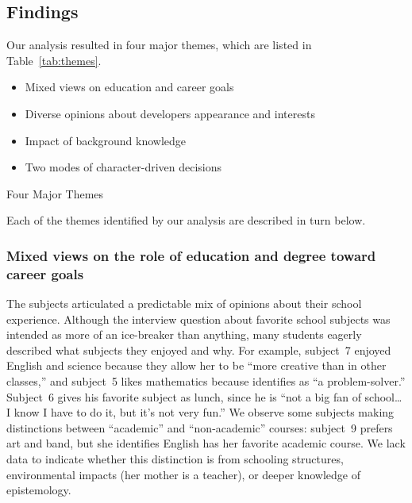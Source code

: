 \documentclass[letterpaper]{article}
\begin{document}
\subsection{Findings}

Our analysis resulted in four major themes, which are listed
in Table~\ref{tab:themes}.
%
\begin{table}
\begin{itemize}
\item Mixed views on education and career goals
\item Diverse opinions about developers appearance and interests
\item Impact of background knowledge
\item Two modes of character-driven decisions
\end{itemize}
\caption{Four Major Themes}
\label{tab:themes}
\end{table}
%
Each of the themes identified by our analysis are described in turn below.


\newcommand{\theme}[1]{\subsubsection*{#1}}

\theme{Mixed views on the role of education and degree toward career goals}

The subjects articulated a predictable mix of opinions about their
school experience. Although the interview question about favorite
school subjects was intended as more of an ice-breaker than anything,
many students eagerly described what subjects they enjoyed and why.
For example, subject~7 enjoyed English and science because they allow her
to be ``more creative than in other classes,'' and subject~5 likes
mathematics because identifies as ``a problem-solver.''
Subject~6 gives his favorite subject as lunch, since he is ``not a big
fan of school\ldots{} I know I have to do it, but it's not very fun.''
We observe some subjects making distinctions between ``academic'' and 
``non-academic'' courses: subject~9 prefers art and band, but she identifies
English has her favorite academic course. We lack data to indicate whether
this distinction is from schooling structures, environmental impacts (her
mother is a teacher), or deeper knowledge of epistemology.
\end{document}
